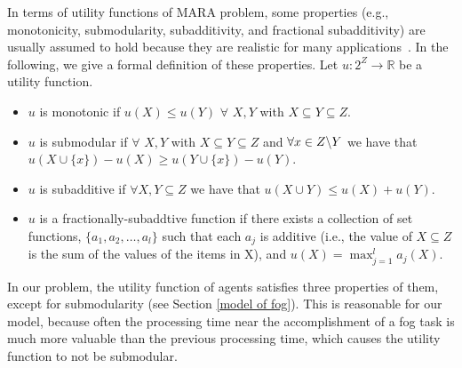 \documentclass[11pt]{phdthesis}
\begin{document}
In terms of utility functions of MARA problem, some properties (e.g., monotonicity, submodularity, subadditivity, and fractional subadditivity) are usually assumed to hold because they are realistic for many applications~\citep{nisan2000bidding}. In the following, we give a formal definition of these properties. Let $ u: 2^Z \rightarrow \mathbb{R} $ be a utility function.
\begin{itemize}
	\item $ u $ is monotonic if $ u(X) \leq u(Y)$ $ \forall$ $ X, Y $ with $X \subseteq Y \subseteq Z $.
	\item $ u $ is submodular if $ \forall$ $ X, Y $ with $X \subseteq Y \subseteq Z $ and $ \forall x \in Z \char`\\ Y $ we have that $ u(X \cup \{x\}) - u(X) \geq u(Y \cup \{x\}) - u(Y) $.
	\item $ u $ is subadditive if $ \forall X,Y \subseteq{Z} $ we have that $ u(X \cup Y) \leq u(X) +u(Y) $.
	
	\item $ u $ is a fractionally-subaddtive function if there exists a collection of set functions, $ \{a_1,a_2,\ldots,a_l\}  $ such that each $ a_j $ is additive (i.e., the value of $ X \subseteq Z $ is the sum of the values of the items in X), and $ u(X) = \max_{j=1}^la_j(X) $.
\end{itemize}
In our problem, the utility function of agents satisfies three properties of them, except for submodularity (see Section \ref{model of fog}). This is reasonable for our model, because often the processing time near the accomplishment of a fog task is much more valuable than the previous processing time, which causes the utility function to not be submodular.

\end{document}
